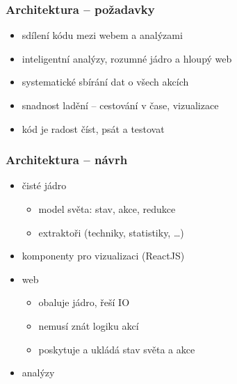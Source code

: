\documentclass[xcolor=dvipsnames, 14pt]{beamer}
\begin{document}
\begin{frame}
\frametitle{Architektura -- požadavky}
\begin{itemize}
\item sdílení kódu mezi webem a analýzami
\item inteligentní analýzy, rozumné jádro a hloupý web
\item systematické sbírání dat o všech akcích
\item snadnost ladění -- cestování v čase, vizualizace
\item kód je radost číst, psát a testovat %
\end{itemize}
\end{frame}

\begin{frame}
\frametitle{Architektura -- návrh}
\begin{itemize}
\item čisté jádro
  \begin{itemize}
  \item model světa: stav, akce, redukce
  \item extraktoři (techniky, statistiky, \ldots)
  \end{itemize}
\item komponenty pro vizualizaci (ReactJS)
\item web  %
  \begin{itemize}
  \item obaluje jádro, řeší IO
  \item nemusí znát logiku akcí
  \item poskytuje a ukládá stav světa a akce
  \end{itemize}
\item analýzy
\end{itemize}
\end{frame}
\end{document}
